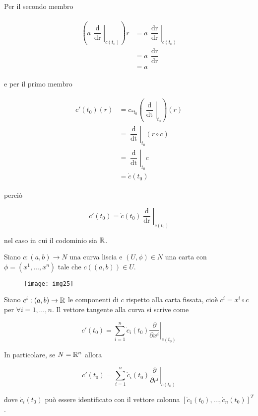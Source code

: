 Per il secondo membro

\begin{align}
	\begin{split}
		\left( a \, \left. \dfrac{\operatorname{d}}{\operatorname{dr}} \right|_{c(t_{0})} \right) r &= a \, \left. \dfrac{\operatorname{dr}}{\operatorname{dr}} \right|_{c(t_{0})}\\
		&= a \, \dfrac{\operatorname{dr}}{\operatorname{dr}}\\
		&= a
	\end{split}
\end{align}

e per il primo membro

\begin{align}
	\begin{split}
		c'(t_{0})(r) &= c_{*t_{0}} \left( \left. \dfrac{\operatorname{d}}{\operatorname{dt}} \right|_{t_{0}} \right)(r)\\
		&= \left. \dfrac{\operatorname{d}}{\operatorname{dt}} \right|_{t_{0}} (r \circ c)\\
		&= \left. \dfrac{\operatorname{d}}{\operatorname{dt}} \right|_{t_{0}} c\\
		&= \dot{c}(t_{0})
	\end{split}
\end{align}

perciò

\begin{equation}
	c'(t_{0}) = \dot{c}(t_{0}) \left. \dfrac{\operatorname{d}}{\operatorname{dr}} \right|_{c(t_{0})}
\end{equation}

nel caso in cui il codominio sia $ \mathbb{R} $.

\begin{definition}\label{loc-exp-tan-cur}
	Siano $ c : (a,b) \to N $ una curva liscia e $ (U,\phi) \in N $ una carta con $ \phi = (x^{1},\dots,x^{n}) $ tale che $ c((a,b)) \in U $.
	
	\begin{figure}[H]
		\centering
		\texttt{[image: img25]}
	\end{figure}
	
	Siano $ c^{i} : (a,b) \to \mathbb{R} $ le componenti di $ c $ rispetto alla carta fissata, cioè $ c^{i} = x^{i} \circ c $ per $ \forall i=1,\dots,n $. Il vettore tangente alla curva si scrive come
	
	\begin{equation}
		c'(t_{0}) = \sum_{i=1}^{n} \dot{c}_{i}(t_{0}) \left. \dfrac{\partial}{\partial x^{i}} \right|_{c(t_{0})}
	\end{equation}

	In particolare, se $ N = \mathbb{R}^{n} $ allora
	
	\begin{equation}
		c'(t_{0}) = \sum_{i=1}^{n} \dot{c}_{i}(t_{0}) \left. \dfrac{\partial}{\partial r^{i}} \right|_{c(t_{0})}
	\end{equation}

	dove $ \dot{c}_{i}(t_{0}) $ può essere identificato con il vettore colonna $ [\dot{c}_{1}(t_{0}),\dots,\dot{c}_{n}(t_{0})]^{T} $.
\end{definition}

